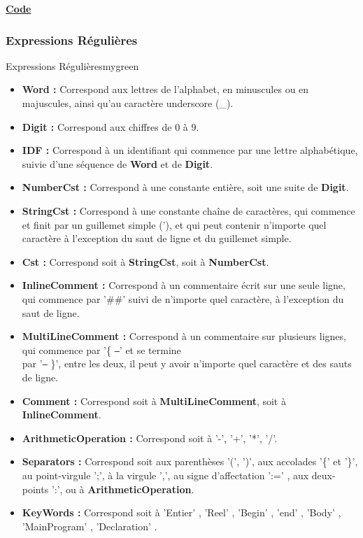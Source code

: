 \vspace{0.5cm}
\textbf{\underline{Code}}

\vspace{0.25cm}


\vspace{0.5cm}

\subsubsection{Expressions Régulières}
\begin{prettyBox}{Expressions Régulières}{mygreen}
    \begin{itemize}
        \item \textbf{Word : } Correspond aux lettres de l'alphabet, en minuscules ou en majuscules, ainsi qu'au caractère underscore (\_).
        \item \textbf{Digit : } Correspond aux chiffres de 0 à 9.
        \item \textbf{IDF : } Correspond à un identifiant qui commence par une lettre alphabétique, suivie d'une séquence de \textbf{Word} et de \textbf{Digit}.
        \item \textbf{NumberCst : } Correspond à une constante entière, soit une suite de \textbf{Digit}.
        \item \textbf{StringCst : } Correspond à une constante chaîne de caractères, qui commence et finit par un guillemet simple ('), et qui peut contenir n'importe quel caractère 
            à l'exception du saut de ligne et du guillemet simple.
        \item \textbf{Cst : } Correspond soit à \textbf{StringCst}, soit à \textbf{NumberCst}.
        \item \textbf{InlineComment : } Correspond à un commentaire écrit sur une seule ligne, qui commence par '\#\#' suivi de n'importe quel caractère, à l'exception du saut de ligne.
        \item \textbf{MultiLineComment : } Correspond à un commentaire sur plusieurs lignes, qui commence par '\{ \texttt{--}' et se termine\\ par '\texttt{--} \}', entre les deux, il peut y avoir n'importe quel caractère et des sauts de ligne.
        \item \textbf{Comment : } Correspond soit à \textbf{MultiLineComment}, soit à \textbf{InlineComment}.
        \item \textbf{ArithmeticOperation : } Correspond soit à '-', '+', '*', '/'.
        \item \textbf{Separators : } Correspond soit aux parenthèses '(', ')', aux accolades '\{' et '\}', au point-virgule ';', à la virgule ',', au signe d'affectation ':=' , aux deux-points ':', ou à \textbf{ArithmeticOperation}.
        \item \textbf{KeyWords : } Correspond soit à 'Entier' , 'Reel' , 'Begin' , 'end' , 'Body' , 'MainProgram' , 'Declaration' .
    \end{itemize}
\end{prettyBox}

